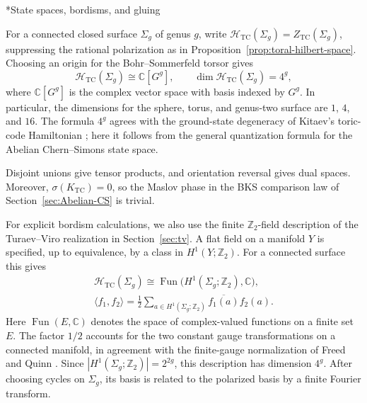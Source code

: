 \documentclass[12pt]{amsart}
\makeatletter
\renewcommand\subsection{\@startsection{subsection}{2}%
  \z@{.5\linespacing\@plus.7\linespacing}{-.5em}%
  {\normalfont\bfseries}}
\numberwithin{equation}{section}
\theoremstyle{definition}
\makeatother
\begin{document}
\subsection*{State spaces, bordisms, and gluing}

For a connected closed surface $\Sigma_g$ of genus $g$, write
$\mathcal H_{\mathrm{TC}}(\Sigma_g)=Z_{\mathrm{TC}}(\Sigma_g)$,
suppressing the rational polarization as in
Proposition~\ref{prop:toral-hilbert-space}. Choosing an origin for the
Bohr--Sommerfeld torsor gives
\begin{equation}
\label{eq:tc-state-spaces}
\mathcal H_{\mathrm{TC}}(\Sigma_g)
\cong\mathbb C[G^g],
\qquad
\dim\mathcal H_{\mathrm{TC}}(\Sigma_g)=4^g,
\end{equation}
where $\mathbb C[G^g]$ is the complex vector space with basis indexed
by $G^g$. In particular, the dimensions for the sphere, torus, and
genus-two surface are $1$, $4$, and $16$. The formula $4^g$ agrees
with the ground-state degeneracy of Kitaev's toric-code Hamiltonian
\cite{kitaev2003anyons}; here it follows from the general quantization
formula for the Abelian Chern--Simons state space.

Disjoint unions give tensor products, and orientation reversal gives
dual spaces. Moreover, $\sigma(K_{\mathrm{TC}})=0$, so the Maslov
phase in the BKS comparison law of Section~\ref{sec:Abelian-CS} is trivial.

For explicit bordism calculations, we also use the finite
$\mathbb Z_2$-field description of the Turaev--Viro realization in
Section~\ref{sec:tv}. A flat field on a manifold $Y$ is specified,
up to equivalence, by a class in $H^1(Y;\mathbb Z_2)$.
For a connected surface this gives
\begin{equation}
\label{eq:tc-flat-state-space}
\begin{gathered}
\mathcal H_{\mathrm{TC}}(\Sigma_g)
\cong
\operatorname{Fun}\bigl(H^1(\Sigma_g;\mathbb Z_2),\mathbb C\bigr),
\\
\langle f_1,f_2\rangle
=
\frac12
\sum_{a\in H^1(\Sigma_g;\mathbb Z_2)}
\overline{f_1(a)}f_2(a).
\end{gathered}
\end{equation}
Here $\operatorname{Fun}(E,\mathbb C)$ denotes the space of
complex-valued functions on a finite set $E$. The factor $1/2$
accounts for the two constant gauge transformations on a connected
manifold, in agreement with the finite-gauge normalization of
Freed and Quinn \cite[Section~5]{Freed:1991}.
Since $|H^1(\Sigma_g;\mathbb Z_2)|=2^{2g}$, this description has
dimension $4^g$. After choosing cycles on $\Sigma_g$, its basis
is related to the polarized basis by a finite Fourier transform.
\end{document}

